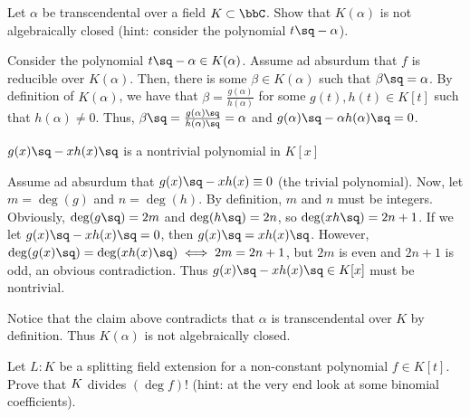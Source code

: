 \documentclass{article}
\begin{document}
\begin{exercise}
  Let $ \alpha $ be transcendental over a field $ K\subset \bbC $.
  Show that $ K(\alpha) $ is not algebraically closed (hint: consider the polynomial $ t\sq-\alpha $).
\end{exercise}

\begin{solution}
Consider the polynomial $ t\sq-\alpha \in K(\alpha) $.
Assume ad absurdum that $ f $ is reducible over $ K(\alpha) $. Then, there is some $ \beta\in K(\alpha) $ such that $ \beta\sq = \alpha $.
By definition of $ K(\alpha) $, we have that $ \beta = \frac{g(\alpha)}{h(\alpha)} $ for some $ g(t),h(t)\in K[t] $ such that $ h(\alpha) \neq 0 $.
Thus, $ \beta\sq = \frac{g(\alpha)\sq}{h(\alpha)\sq} = \alpha $ and $ g(\alpha)\sq - \alpha h(\alpha)\sq = 0 $.
\begin{claim}
  $ g(x)\sq - x h(x)\sq $ is a nontrivial polynomial in $ K[x] $
\end{claim}
\begin{subproof}
  Assume ad absurdum that $ g(x)\sq - xh(x) \equiv 0 $ (the trivial polynomial).
  Now, let $ m = \deg (g) $ and $ n = \deg (h) $.
  By definition, $ m $ and $ n $ must be integers.
  Obviously, $ \deg(g\sq) = 2m $ and $ \deg(h\sq) = 2n $, so $ \deg(x h\sq) = 2n+1 $.
  If we let $ g(x)\sq - x h(x)\sq = 0 $, then $ g(x)\sq = xh(x)\sq $.
  However, $ \deg(g(x)\sq) = \deg(xh(x)\sq) \iff 2m = 2n+1 $, but $ 2m $ is even and $ 2n+1 $ is odd, an obvious contradiction.
  Thus $ g(x)\sq - x h(x)\sq \in K[x] $ must be nontrivial.
\end{subproof}
Notice that the claim above contradicts that $ \alpha $ is transcendental over $ K $ by definition.
Thus $ K(\alpha) $ is not algebraically closed.
\end{solution}

\begin{exercise}
  Let $ L:K $ be a splitting field extension for a non-constant polynomial $ f\in K[t] $.
  Prove that $ \index{L}{K} $ divides $ (\deg f)! $ (hint: at the very end look at some binomial coefficients).
\end{exercise}
\end{document}
